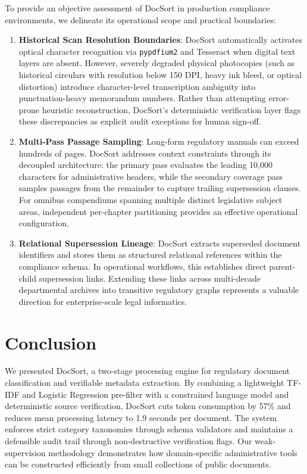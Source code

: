 \documentclass{article}
\begin{document}
To provide an objective assessment of DocSort in production compliance environments, we delineate its operational scope and practical boundaries:
\begin{enumerate}
    \item \textbf{Historical Scan Resolution Boundaries}: DocSort automatically activates optical character recognition via \texttt{pypdfium2} and Tesseract when digital text layers are absent. However, severely degraded physical photocopies (such as historical circulars with resolution below 150 DPI, heavy ink bleed, or optical distortion) introduce character-level transcription ambiguity into punctuation-heavy memorandum numbers. Rather than attempting error-prone heuristic reconstruction, DocSort's deterministic verification layer flags these discrepancies as explicit audit exceptions for human sign-off.
    \item \textbf{Multi-Pass Passage Sampling}: Long-form regulatory manuals can exceed hundreds of pages. DocSort addresses context constraints through its decoupled architecture: the primary pass evaluates the leading 10,000 characters for administrative headers, while the secondary coverage pass samples passages from the remainder to capture trailing supersession clauses. For omnibus compendiums spanning multiple distinct legislative subject areas, independent per-chapter partitioning provides an effective operational configuration.
    \item \textbf{Relational Supersession Lineage}: DocSort extracts superseded document identifiers and stores them as structured relational references within the compliance schema. In operational workflows, this establishes direct parent-child supersession links. Extending these links across multi-decade departmental archives into transitive regulatory graphs represents a valuable direction for enterprise-scale legal informatics.
\end{enumerate}

\section{Conclusion}

We presented DocSort, a two-stage processing engine for regulatory document classification and verifiable metadata extraction. By combining a lightweight TF-IDF and Logistic Regression pre-filter with a constrained language model and deterministic source verification, DocSort cuts token consumption by 57\% and reduces mean processing latency to 1.9 seconds per document. The system enforces strict category taxonomies through schema validators and maintains a defensible audit trail through non-destructive verification flags. Our weak-supervision methodology demonstrates how domain-specific administrative tools can be constructed efficiently from small collections of public documents.



\end{document}
